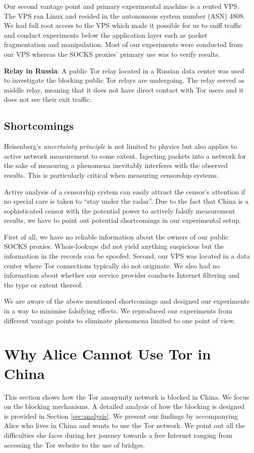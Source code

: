 \documentclass[runningheads,a4paper]{llncs}
\begin{document}
Our second vantage point and primary experimental machine is a rented VPS. The VPS ran Linux and
resided in the autonomous system number (ASN) 4808. We had full root access to the VPS which made it
possible for us to sniff traffic and conduct experiments below the application layer such as packet
fragmentation and manipulation.  Most of our experiments were conducted from our VPS whereas the
SOCKS proxies' primary use was to verify results.

\textbf{Relay in Russia}: A public Tor relay located in a Russian data center was used to
investigate the blocking public Tor relays are undergoing. The relay served as middle relay, meaning
that it does not have direct contact with Tor users and it does not see their exit traffic.

\subsection{Shortcomings}
Heisenberg's \emph{uncertainty principle} is not limited to physics \cite{Jia2009} but also applies
to active network measurement to some extent. Injecting packets into a network for the sake of
measuring a phenomena inevitably interferes with the observed results. This is particularly critical
when measuring censorship systems.

Active analysis of a censorship system can easily attract the censor's attention if no special care
is taken to ``stay under the radar''. Due to the fact that China is a sophisticated censor with the
potential power to actively falsify measurement results, we have to point out potential shortcomings
in our experimental setup.

First of all, we have no reliable information about the owners of our public SOCKS proxies.
Whois-lookups did not yield anything suspicious but the information in the records can be spoofed.
Second, our VPS was located in a data center where Tor connections typically do not originate.
We also had no information about whether our service provider conducts Internet filtering and
the type or extent thereof.

We are aware of the above mentioned shortcomings and designed our experiments in a way to minimise
falsifying effects. We reproduced our experiments from different vantage points to eliminate
phenomena limited to one point of view.


\section{Why Alice Cannot Use Tor in China}
\label{sec:results}
This section shows how the Tor anonymity network is blocked in China. We focus on the blocking
mechanisms. A detailed analysis of how the blocking is designed is provided in Section
\ref{sec:analysis}. We present our findings by accompanying Alice who lives in China and wants to
use the Tor network. We point out all the difficulties she faces during her journey towards a free
Internet ranging from accessing the Tor website \cite{tpo0} to the use of bridges.
\end{document}
